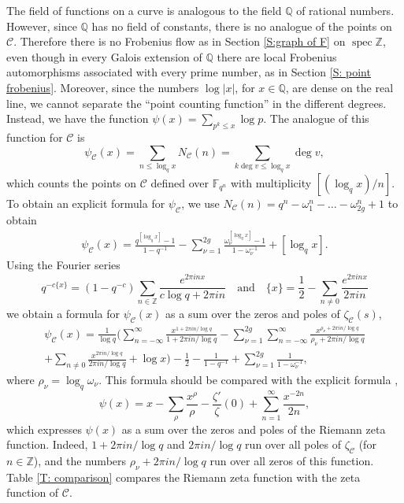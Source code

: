\documentclass{amsart}
\newcommand\Z{\mathbb{Z}}	\newcommand\C{\mathbb{C}}
\newcommand\Q{\mathbb{Q}}	\newcommand\R{\mathbb{R}}
\newcommand\spec{\operatorname{spec}}
\newcommand\F{\mathbb{F}}
\newcommand\Curve{\mathcal{C}}
\theoremstyle{definition}\newtheorem{definition}[theorem]{Definition}
\theoremstyle{remark}\newtheorem{remark}[theorem]{Remark}
\numberwithin{equation}{section}
\begin{document}
The field of functions on a curve is analogous to the field $\Q$ of rational numbers.
However,
since $\Q$ has no field of constants,
there is no analogue of the points on~$\Curve$.
Therefore there is no Frobenius flow as in Section \ref{S:graph of F} on $\spec\Z$,
even though in every Galois extension of $\Q$ there are local Frobenius automorphisms associated with every prime number,
 as in Section \ref{S: point frobenius}.
Moreover,
since the numbers $\log|x|$,
 for $x\in\Q$,
are dense on the real line,
we cannot separate the ``point counting function'' in the different degrees.
Instead,
we have the function $\psi(x)=\sum_{p^k\leq x}\log p$.
The analogue of this function for $\Curve$ is
$$
\psi_\Curve(x)=\sum_{n\leq\log_q x}N_\Curve(n)=\sum_{k\deg v\leq\log_qx}\deg v,
$$
which counts the points on $\Curve$ defined over ${\F_{q^n}}$ with multiplicity $[(\log_qx)/n]$.
To obtain an explicit formula for $\psi_\Curve$,
we use
$
N_\Curve(n)=q^n-\omega_1^n-\dots-\omega_{2g}^n+1
$
to obtain
\begin{gather*}
\psi_\Curve(x)=
\frac{q^{[\log_qx]}-1}{1-q^{-1}}-\sum_{\nu=1}^{2g}\frac{\omega_\nu^{[\log_qx]}-1}{1-\omega_\nu^{-1}}+[\log_qx].
\end{gather*}
Using the Fourier series
$$
q^{-c\{x\}}=(1-q^{-c})\sum_{n\in\Z}\frac{e^{2\pi inx}}{c\log q+2\pi in}\quad\text{and}\quad
\{x\}=\frac12-\sum_{n\neq0}\frac{e^{2\pi inx}}{2\pi in}
$$
we obtain a formula for $\psi_\Curve(x)$ as a sum over the zeros and poles of $\zeta_\Curve(s)$,
\begin{multline*}
\psi_\Curve(x)=\frac{1}{\log q}\Biggl(\sum_{n=-\infty}^\infty\frac{x^{1+2\pi in/\log q}}{1+2\pi in/\log q}
-\sum_{\nu=1}^{2g}\sum_{n=-\infty}^\infty\frac{x^{\rho_\nu+2\pi in/\log q}}{\rho_\nu+2\pi in/\log q}\\
+\sum_{n\neq0}\frac{x^{2\pi in/\log q}}{2\pi in/\log q}+\log x\Biggr)
-\frac12-\frac1{1-q^{-1}}+\sum_{\nu=1}^{2g}\frac1{1-\omega_\nu^{-1}},
\end{multline*}
where $\rho_\nu=\log_q\omega_\nu$.
This formula should be compared with the explicit formula \cite[Thm.\ 29, p. 77]{Ingham},
$$
\psi(x)=x-\sum_\rho\frac{x^\rho}\rho-\frac{\zeta'}\zeta(0)+\sum_{n=1}^\infty\frac{x^{-2n}}{2n},
$$
which expresses $\psi(x)$ as a sum over the zeros and poles of the Riemann zeta function.
Indeed,
$1+2\pi in/\log q$ and $2\pi in/\log q$ run over all poles of $\zeta_\Curve$ (for $n\in\Z$),
and the numbers $\rho_\nu+2\pi in/\log q$ run over all zeros of this function.
Table \ref{T: comparison} compares the Riemann zeta function with the zeta function of $\Curve$.
\end{document}
